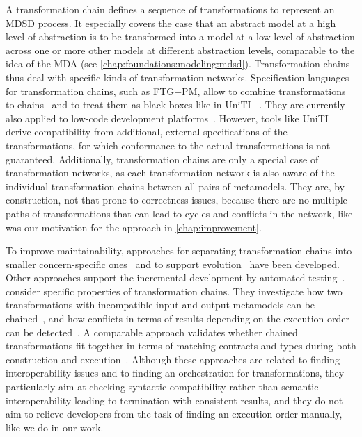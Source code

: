 A transformation chain defines a sequence of transformations to represent an \gls{MDSD} process.
It especially covers the case that an abstract model at a high level of abstraction is to be transformed into a model at a low level of abstraction across one or more other models at different abstraction levels, comparable to the idea of the \gls{MDA} (see \autoref{chap:foundations:modeling:mdsd}).
Transformation chains thus deal with specific kinds of transformation networks.
Specification languages for transformation chains, such as FTG+PM,
allow to combine transformations to chains~\cite{lucio2013FTGPM-SDL} and to treat them as black-boxes like in UniTI
~\cite{vanhooff2006a, vanhooff2007UniTI-MODELS, pilgrim2008constructingChains-ECMDA}.
They are currently also applied to low-code development platforms~\cite{sahay2020TransformationCompositionLowCode-Models}.
However, tools like UniTI derive compatibility from additional, external specifications of the transformations, for which conformance to the actual transformations is not guaranteed.
Additionally, transformation chains are only a special case of transformation networks, as each transformation network is also aware of the individual transformation chains between all pairs of metamodels.
They are, by construction, not that prone to correctness issues, because there are no multiple paths of transformations that can lead to cycles and conflicts in the network, like was our motivation for the \commonalities approach in \autoref{chap:improvement}.

To improve maintainability, approaches for separating transformation chains into smaller concern-specific ones~\cite{yie2012a} and to support evolution~\cite{yie2009a} have been developed.
Other approaches support the incremental development by automated testing~\cite{kuester2009incremetalChainDevelopment-MODELS}.
 consider specific properties of transformation chains.
They investigate how two transformations with incompatible input and output metamodels can be chained~\cite{etien2010Combining-SAC}, and how conflicts in terms of results depending on the execution order can be detected~\cite{etien2012Chaining-AMT}.
A comparable approach validates whether chained transformations fit together in terms of matching contracts and types during both construction and execution~\cite{heidenreich2010compositionTransformations-ICMT}.
Although these approaches are related to finding interoperability issues and to finding an orchestration for transformations, they particularly aim at checking syntactic compatibility rather than semantic interoperability leading to termination with consistent results, and they do not aim to relieve developers from the task of finding an execution order manually, like we do in our work.


